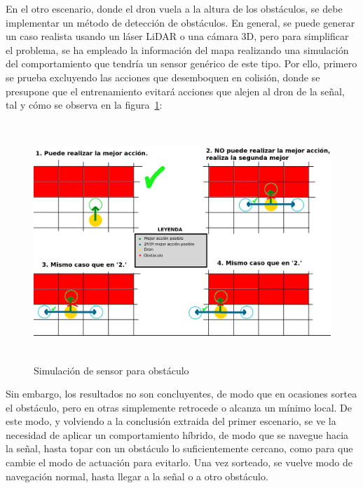 En el otro escenario, donde el dron vuela a la altura de los obstáculos, se debe implementar un método de detección de obstáculos. En general, se puede generar un caso realista usando un láser LiDAR o una cámara 3D, pero para simplificar el problema, se ha empleado la información del mapa realizando una simulación del comportamiento que tendría un sensor genérico de este tipo. Por ello, primero se prueba excluyendo las acciones que desemboquen en colisión, donde se presupone que el entrenamiento evitará acciones que alejen al dron de la señal, tal y cómo se observa en la figura~\ref{fig:pseudosensor}:

\begin{figure} [H]
    \begin{center}
    \includegraphics[height=9cm]{imagenes/cap4/28_pseudosensor.png}
    \end{center}
    \caption[Simulación de sensor para obstáculo]{Simulación de sensor para obstáculo}
    \label{fig:pseudosensor}
\end{figure}

Sin embargo, los resultados no son concluyentes, de modo que en ocasiones sortea el obstáculo, pero en otras simplemente retrocede o alcanza un mínimo local. De este modo, y volviendo a la conclusión extraida del primer escenario, se ve la necesidad de aplicar un comportamiento híbrido, de modo que se navegue hacia la señal, hasta topar con un obstáculo lo suficientemente cercano, como para que cambie el modo de actuación para evitarlo. Una vez sorteado, se vuelve modo de navegación normal, hasta llegar a la señal o a otro obstáculo.\\

